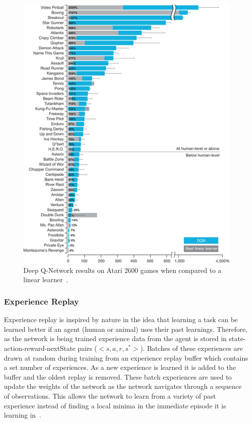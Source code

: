 \documentclass[12pt,american]{report}
\begin{document}
\begin{figure}
\centering
\includegraphics[scale=.5]{images/dqn-results.jpg}
\caption{Deep Q-Network results on Atari 2600 games when compared to a linear learner~\cite{atari}.}
\label{fig:dqn-results}
\end{figure}

\subsubsection{Experience Replay}

Experience replay is inspired by nature in the idea that learning a task can be learned better if an agent (human or animal) uses their past learnings.  Therefore, as the network is being trained experience data from the agent is stored in state-action-reward-nextState pairs ($<s,a,r,s^{*}>$). Batches of these experiences are drawn at random during training from an experience replay buffer which contains a set number of experiences.  As a new experience is learned it is added to the buffer and the oldest replay is removed. These batch experiences are used to update the weights of the network as the network navigates through a sequence of observations.  This allows the network to learn from a variety of past experience instead of finding a local minima in the immediate episode it is learning in~\cite{atari}.
\end{document}
